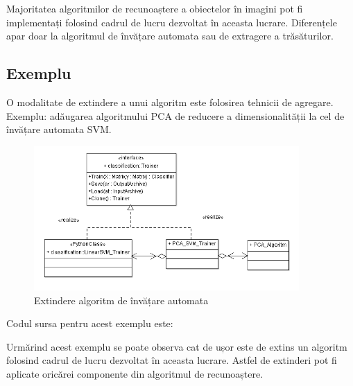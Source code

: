 Majoritatea algoritmilor de recunoaștere a obiectelor în imagini pot fi implementați folosind cadrul de lucru dezvoltat în aceasta lucrare. Diferențele apar doar la algoritmul de învățare automata sau de extragere a trăsăturilor.

\subsection{Exemplu}
O modalitate de extindere a unui algoritm este folosirea tehnicii de agregare.
Exemplu: adăugarea algoritmului PCA de reducere a dimensionalității la cel de învățare automata SVM.

\begin{figure}[H]
	\centering
		\includegraphics[width=0.90\textwidth]{uml/pca_classifier_diagram.png}
	\caption{Extindere algoritm de învățare automata}
	\label{fig:pca_classifier_diagram}
\end{figure}

Codul sursa pentru acest exemplu este:


Urmărind acest exemplu se poate observa cat de ușor este de extins un algoritm folosind cadrul de lucru dezvoltat în aceasta lucrare.
Astfel de extinderi pot fi aplicate oricărei componente din algoritmul de recunoaștere.
%